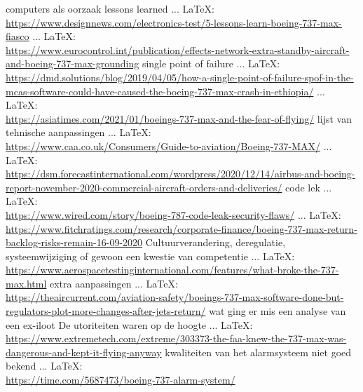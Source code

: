 \begin{thebibliography}{99}
{{{computers als oorzaak
lessons learned
 ... \LaTeX:\\ \url{https://www.designnews.com/electronics-test/5-lessons-learn-boeing-737-max-fiasco}
 ... \LaTeX:\\ \url{https://www.eurocontrol.int/publication/effects-network-extra-standby-aircraft-and-boeing-737-max-grounding}
single point of failure
 ... \LaTeX:\\ \url{https://dmd.solutions/blog/2019/04/05/how-a-single-point-of-failure-spof-in-the-mcas-software-could-have-caused-the-boeing-737-max-crash-in-ethiopia/}
 ... \LaTeX:\\ \url{https://asiatimes.com/2021/01/boeings-737-max-and-the-fear-of-flying/}
lijst van tehnische aanpassingen
 ... \LaTeX:\\ \url{https://www.caa.co.uk/Consumers/Guide-to-aviation/Boeing-737-MAX/}
 ... \LaTeX:\\ \url{https://dsm.forecastinternational.com/wordpress/2020/12/14/airbus-and-boeing-report-november-2020-commercial-aircraft-orders-and-deliveries/}
code lek
 ... \LaTeX:\\ \url{https://www.wired.com/story/boeing-787-code-leak-security-flaws/}
 ... \LaTeX:\\ \url{https://www.fitchratings.com/research/corporate-finance/boeing-737-max-return-backlog-risks-remain-16-09-2020}
Cultuurverandering, deregulatie, systeemwijziging of gewoon een kwestie van competentie
 ... \LaTeX:\\ \url{https://www.aerospacetestinginternational.com/features/what-broke-the-737-max.html}
extra aanpassingen
 ... \LaTeX:\\ \url{https://theaircurrent.com/aviation-safety/boeings-737-max-software-done-but-regulators-plot-more-changes-after-jets-return/}
wat ging er mis een analyse van een ex-iloot
De utoriteiten waren op de hoogte
 ... \LaTeX:\\ \url{https://www.extremetech.com/extreme/303373-the-faa-knew-the-737-max-was-dangerous-and-kept-it-flying-anyway}
kwaliteiten van het alarmsysteem niet goed bekend
 ... \LaTeX:\\ \url{https://time.com/5687473/boeing-737-alarm-system/}
}}}
\end{thebibliography}
